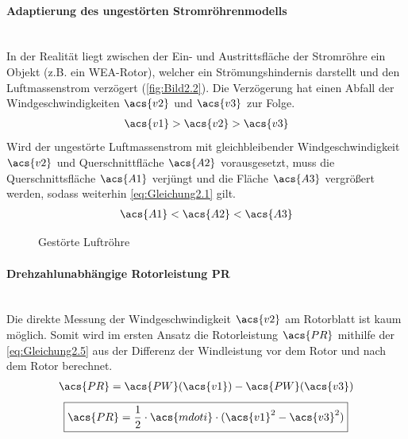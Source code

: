 \paragraph{Adaptierung des ungestörten Stromröhrenmodells}\mbox{}\smallskip\\
In der Realität liegt zwischen der Ein- und Austrittsfläche der Stromröhre ein Objekt (z.B. ein WEA-Rotor), welcher ein Strömungshindernis darstellt und den Luftmassenstrom verzögert (\autoref{fig:Bild2.2}). Die Verzögerung hat einen Abfall der Windgeschwindigkeiten $\acs{v2}$ und $\acs{v3}$ zur Folge.
\begin{align*}
    \acs{v1} > \acs{v2} > \acs{v3}
\end{align*}
\newline
Wird der ungestörte Luftmassenstrom mit gleichbleibender Windgeschwindigkeit $\acs{v2}$ und Querschnittfläche $\acs{A2}$ vorausgesetzt, muss die Querschnittsfläche $\acs{A1}$ verjüngt und die Fläche $\acs{A3}$ vergrößert werden, sodass weiterhin \autoref{eq:Gleichung2.1} gilt.
\begin{align*}
    \acs{A1} < \acs{A2} < \acs{A3}
\end{align*}
\begin{figure}[H]
   \centering
   \caption[Gestörte Luftröhre]{Gestörte Luftröhre \cite{SkriptSchulte}}
   \label{fig:Bild2.2}
\end{figure}

\paragraph{Drehzahlunabhängige Rotorleistung \acs{PR}}\mbox{}\smallskip\\
Die direkte Messung der Windgeschwindigkeit $\acs{v2}$ am Rotorblatt ist kaum möglich. Somit wird im ersten Ansatz die Rotorleistung $\acs{PR}$ mithilfe der \autoref{eq:Gleichung2.5} aus der Differenz der Windleistung vor dem Rotor und nach dem Rotor berechnet.
\begin{align*} \label{eq:Gleichung2.8}
    \acs{PR} = \acs{PW}(\acs{v1}) - \acs{PW}(\acs{v3})
\end{align*}
\begin{equation}\label{eq:Gleichung2.8}
    \boxed{\acs{PR} = \frac{1}{2} \cdot \acs{mdoti} \cdot (\acs{v1}^2 - \acs{v3}^2)}
\end{equation}

